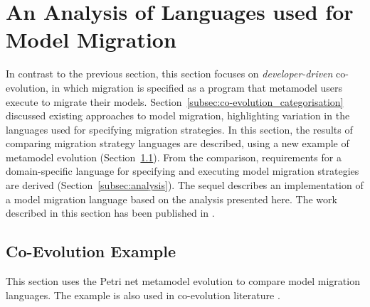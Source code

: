 
\section[An Analysis of Languages used for Model Migration][An Analysis of Model Migration Languages]{An Analysis of Languages used for Model Migration}
\label{sec:analyis_of_languages_used_for_migration}
In contrast to the previous section, this section focuses on \emph{developer-driven} co-evolution, in which migration is specified as a program that metamodel users execute to migrate their models. Section~\ref{subsec:co-evolution_categorisation} discussed existing approaches to model migration, highlighting variation in the languages used for specifying migration strategies. In this section, the results of comparing migration strategy languages are described, using a new example of metamodel evolution (Section~\ref{subsec:co-evo_example}). From the comparison, requirements for a domain-specific language for specifying and executing model migration strategies are derived (Section~\ref{subsec:analysis}). The sequel describes an implementation of a model migration language based on the analysis presented here. The work described in this section has been published in \cite{rose10flock}.

\subsection{Co-Evolution Example}
\label{subsec:co-evo_example}
This section uses the Petri net metamodel evolution to compare model migration languages. The example is also used in co-evolution literature \cite{cicchetti08automating,garces09managing,wachsmuth07metamodel}.

